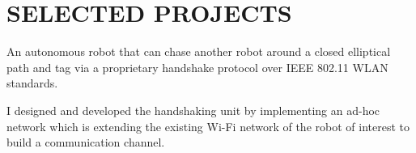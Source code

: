 \documentclass[letterpaper]{deedy-resume} %
\begin{document}
\begin{minipage}[t]{0.66\textwidth}
%

\section{SELECTED PROJECTS}



\sectionspace %

\begin{tightitemize}
\item An autonomous robot that can chase another robot around a closed elliptical path and tag via a proprietary handshake protocol over IEEE 802.11 WLAN standards.

\item I designed and developed the handshaking unit by implementing an ad-hoc network which is extending the existing Wi-Fi network of the robot of interest to build a communication channel.


\end{tightitemize}
\end{minipage}
\end{document}
